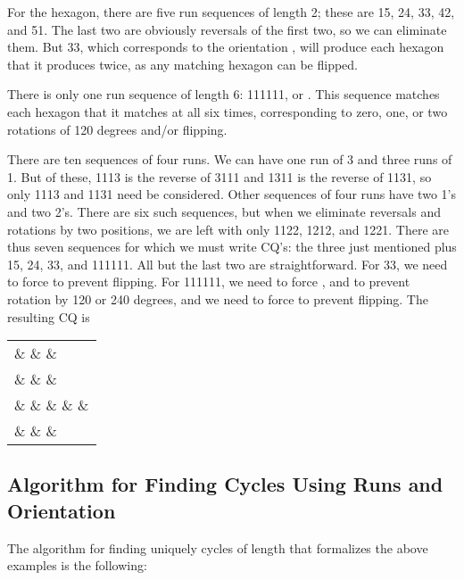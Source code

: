 \begin{example}
\label{hex-ex}
For the hexagon, there are five run sequences of length 2; these are 15, 24, 33, 42, and 51.  The last two are obviously reversals of the first two, so we can eliminate them.  But 33, which corresponds to the orientation , will produce each hexagon that it produces twice, as any matching hexagon can be flipped.

There is only one run sequence of length 6: 111111, or .  This sequence matches each hexagon that it matches at all six times, corresponding to zero, one, or two rotations of 120 degrees and/or flipping.

There are ten sequences of four runs.  We can have one run of 3 and three runs of 1.  But of these, 1113 is the reverse of 3111 and 1311 is the reverse of 1131, so only 1113 and 1131 need be considered.   Other sequences of four runs have two 1's and two 2's.  There are six such sequences, but when we eliminate reversals and rotations by two positions, we are left with only 1122, 1212, and 1221.  There are thus seven sequences for which we must write CQ's: the three just mentioned plus 15, 24, 33, and 111111.  All but the last two are straightforward.  For 33, we need to force  to prevent flipping.   For 111111, we need to force , and  to prevent rotation by 120 or 240 degrees, and we need to force  to prevent flipping.  The resulting CQ is

\begin{center}
\begin{tabular}{l}
 \&  \&  \& \\
 \&  \&  \& \\
 \&  \&  \&  \&  \& \\
 \&  \&  \& \\
\end{tabular}
\end{center}
\end{example}

\subsection{Algorithm for Finding Cycles Using Runs and Orientation}

The algorithm for finding uniquely cycles of length  that formalizes the above examples is the following:

